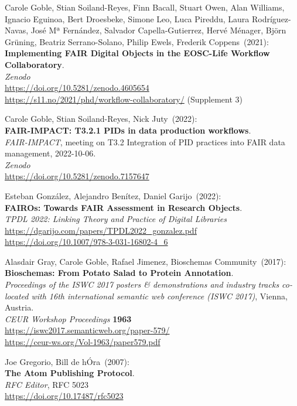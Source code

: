 \begin{thebibliography}{9}
Carole Goble, Stian Soiland-Reyes, Finn Bacall, Stuart Owen, Alan Williams, Ignacio Eguinoa, Bert Droesbeke, Simone Leo, Luca Pireddu, Laura Rodríguez-Navas, José Mª Fernández, Salvador Capella-Gutierrez, Hervé Ménager, Björn Grüning, Beatriz Serrano-Solano, Philip Ewels, Frederik Coppens~(2021): \\
\textbf{Implementing FAIR Digital Objects in the EOSC-Life Workflow Collaboratory}.\\
\emph{Zenodo}\\
\url{https://doi.org/10.5281/zenodo.4605654}\\
\url{https://s11.no/2021/phd/workflow-collaboratory/} (Supplement 3)

Carole Goble, Stian Soiland-Reyes, Nick Juty~(2022): \\
\textbf{FAIR-IMPACT: T3.2.1 PIDs in data production workflows}.\\
\emph{FAIR-IMPACT}, meeting on T3.2 Integration of PID practices into FAIR data management, 2022-10-06.\\
\emph{Zenodo}\\
\url{https://doi.org/10.5281/zenodo.7157647}

Esteban González, Alejandro Benítez, Daniel Garijo~(2022): \\
\textbf{FAIROs: Towards FAIR Assessment in Research Objects}.\\
\emph{TPDL 2022: Linking Theory and Practice of Digital Libraries}\\
\url{https://dgarijo.com/papers/TPDL2022_gonzalez.pdf}\\
\url{https://doi.org/10.1007/978-3-031-16802-4_6}

Alasdair Gray, Carole Goble, Rafael Jimenez, Bioschemas Community~(2017): \\
\textbf{Bioschemas: From Potato Salad to Protein Annotation}.\\
\emph{Proceedings of the ISWC 2017 posters \& demonstrations and industry tracks co-located with 16th international semantic web conference (ISWC 2017)}, Vienna, Austria.\\
\emph{CEUR Workshop Proceedings} \textbf{1963} \\
\url{https://iswc2017.semanticweb.org/paper-579/} \\
\url{https://ceur-ws.org/Vol-1963/paper579.pdf}

Joe Gregorio, Bill de hÓra~(2007): \\
\textbf{The {Atom Publishing Protocol}}.\\
\emph{RFC Editor}, RFC 5023\\
\url{https://doi.org/10.17487/rfc5023}


\end{thebibliography}
